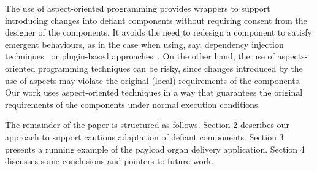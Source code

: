 The use of aspect-oriented programming  provides wrappers to support introducing changes into defiant components without requiring consent from the designer of the components. It avoids the need to redesign a component to satisfy emergent behaviours, as in the case when using, say,  dependency injection techniques~\cite{fowlerioc}  or plugin-based approaches~\cite{Wermelinger:2008:AEE:1370750.1370783}. On the other hand, the use of aspects-oriented programming techniques can be risky, since changes introduced by the use of aspects may violate the original (local) requirements of the components. Our work uses aspect-oriented techniques in a way that guarantees the original requirements of the components under normal execution conditions.  

The remainder of the paper is structured as follows. Section 2 describes our approach to support cautious adaptation of defiant components. Section 3 presents a running example of the payload organ delivery application. Section 4  discusses some conclusions and pointers to future work.





